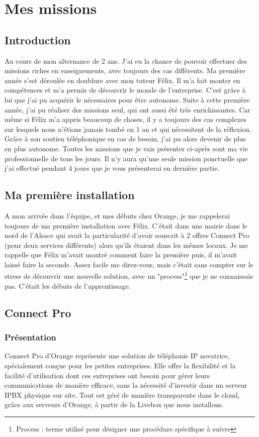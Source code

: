 \documentclass[12pt, a4paper]{article}
\begin{document}
\newpage 
\section{Mes missions}
\subsection{Introduction}
Au cours de mon alternance de 2 ans. J'ai eu la chance
de pouvoir effectuer des missions riches en 
enseignements, avec toujours des cas différents. 
Ma première année s'est déroulée en doublure avec 
mon tuteur Félix. Il m'a fait monter en compétences
et m'a permis de découvrir le monde de l'entreprise.
C'est grâce à lui que j'ai pu acquérir le
nécessaires pour être autonome. Suite à cette première
année, j'ai pu réaliser des missions seul, qui ont aussi 
été très enrichissantes. Car même si Félix m'a appris 
beaucoup de choses, il y a toujours des cas complexes 
sur lesquels nous n'étions jamais tombé en 1 an et
qui nécessitent de la réflexion. Grâce à son soutien 
téléphonique en cas de besoin, j'ai pu alors
devenir de plus en plus autonome. Toutes les missions 
que je vais présenter ci-après sont ma vie professionnelle
de tous les jours. Il n'y aura qu'une seule mission 
ponctuelle que j'ai effectué pendant 4 jours que je 
vous présenterai en dernière partie.

\subsection{Ma première installation}
A mon arrivée dans l'équipe, et mes débuts chez Orange, 
je me rappelerai toujours de ma première installation 
avec Félix. C'était dans une mairie dans le nord
de l'Alsace qui avait la particularité d'avoir 
souscrit à 2 offres Connect Pro (pour deux services différents) 
alors qu'ils étaient dans les mêmes locaux. Je me rappelle que Félix m'avait
montré comment faire la première puis, il m'avait laissé
faire la seconde. Assez facile me direz-vous, mais
c'était sans compter sur le stress de découvrir 
une nouvelle solution, avec un "process"\footnote{Process : terme utilisé pour désigner une procédure spécifique à suivre} que je ne connaissais 
pas. C'était les débuts de l'apprentissage. 

\subsection{Connect Pro}
\subsubsection{Présentation}
Connect Pro d'Orange représente une solution
de téléphonie IP novatrice, spécialement conçue pour
les petites entreprises. Elle offre la flexibilité et
la facilité d'utilisation dont ces entreprises ont
besoin pour gérer leurs communications de manière
efficace, sans la nécessité d'investir dans un
serveur IPBX physique sur site. Tout est géré de
manière transparente dans le cloud, grâce aux
serveurs d'Orange, à partir de la Livebox
que nous installons.\\
\end{document}
